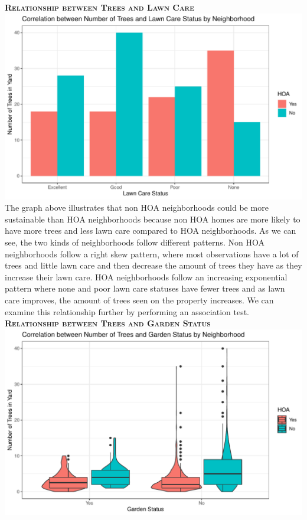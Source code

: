 \documentclass{article}
\begin{document}
\newpage
\textsc{\textbf{Relationship between Trees and Lawn Care}}
\newline
\newline
\includegraphics{part2-038}
\newline
The graph above illustrates that non HOA neighborhoods could be more sustainable than HOA neighborhoods because non HOA homes are more likely to have more trees and less lawn care compared to HOA neighborhoods. As we can see, the two kinds of neighborhoods follow different patterns. Non HOA neighborhoods follow a right skew pattern, where most observations have a lot of trees and little lawn care and then decrease the amount of trees they have as they increase their lawn care. HOA neighborhoods follow an increasing exponential pattern where none and poor lawn care statuses have fewer trees and as lawn care improves, the amount of trees seen on the property increases.
\newline
We can examine this relationship further by performing an association test. 
\newpage
\textsc{\textbf{Relationship between Trees and Garden Status}}
\newline
\newline
\includegraphics{part2-039}
\end{document}
